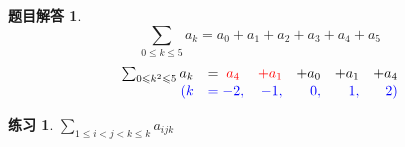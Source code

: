 \documentclass[mode=geye]{elegantnote}
\newtheorem{exercise}{练习}
\newtheorem{answer}{题目解答}
\begin{document}
\begin{answer}
    \begin{equation*}
        \sum_{0\leqslant k\leqslant 5}a_k = a_0+a_1+a_2+a_3+a_4+a_5
    \end{equation*}
    \begin{equation*}
        \begin{array}{rlrrrr}
            \sum_{0\leqslant k^2\leqslant 5}a_k 
            &= {\color{red} \;a_4}&{\color{red}+a_1}&+a_0&+a_1&+a_4 \\
            {\color{blue}(k}&{\color{blue}= -2,} &{\color{blue}-1,} &{\color{blue}0, }&{\color{blue}1, }&{\color{blue}2)}\\
        \end{array}
    \end{equation*}
\end{answer}

\begin{exercise}
    $ \sum_{1\leqslant i< j<k\leqslant k} a_{ijk}$ 
\end{exercise}
\end{document}
